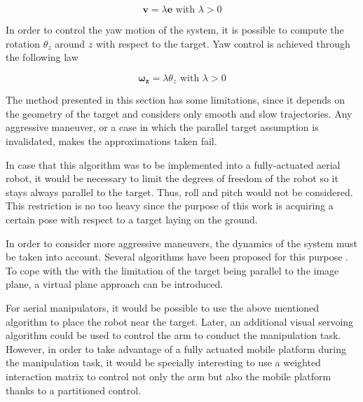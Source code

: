 \begin{equation}
\bm{v} = \lambda \bm{e} \text{ with } \lambda > 0
\end{equation}

In order to control the yaw motion of the system, it is possible to compute the rotation $\theta_z$ around $z$ with respect to the target. Yaw control is achieved through the following law

\begin{equation}
\bm{\omega_z} = \lambda \theta_z \text{ with } \lambda > 0
\end{equation}

The method presented in this section has some limitations, since it depends on the geometry of the target and considers only smooth and slow trajectories. Any aggressive maneuver, or a case in which the parallel target assumption is invalidated, makes the approximations taken fail.

In case that this algorithm was to be implemented into a fully-actuated aerial robot, it would be necessary to limit the degrees of freedom of the robot so it stays always parallel to the target. Thus, roll and pitch would not be considered. This restriction is no too heavy since the purpose of this work is acquiring a certain pose with respect to a target laying on the ground. 

In order to consider more aggressive maneuvers, the dynamics of the system must be taken into account. Several algorithms have been proposed for this purpose \cite{ozawa_2011} \cite{jabbari_dynamic_2012} \cite{ceren_image_2012}. To cope with the with the limitation of the target being parallel to the image plane, a virtual plane approach \cite{zheng_image-based_2017} can be introduced.

For aerial manipulators, it would be possible to use the above mentioned algorithm to place the robot near the target. Later, an additional visual servoing algorithm could be used to control the arm to conduct the manipulation task. However, in order to take advantage of a fully actuated mobile platform during the manipulation task, it would be specially interesting to use a weighted interaction matrix \cite{santamaria-navarro_uncalibrated_2017} to control not only the arm but also the mobile platform thanks to a partitioned control.